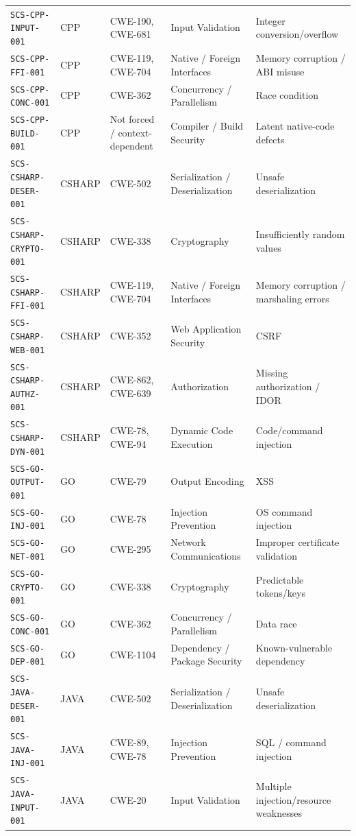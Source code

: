 \documentclass[10pt,letterpaper]{article}
\newcommand{\code}[1]{\begingroup\small\ttfamily\def\UrlFont{\ttfamily}\nolinkurl{#1}\endgroup}
\begin{document}
\begin{landscape}
\begin{longtable}{@{}P{1.3in}P{0.7in}P{1.4in}P{1.8in}P{3.8in}@{}}
\code{SCS-CPP-INPUT-001} & CPP & CWE-190, CWE-681 & Input Validation & Integer conversion/overflow\\
\code{SCS-CPP-FFI-001} & CPP & CWE-119, CWE-704 & Native / Foreign Interfaces & Memory corruption / ABI misuse\\
\code{SCS-CPP-CONC-001} & CPP & CWE-362 & Concurrency / Parallelism & Race condition\\
\code{SCS-CPP-BUILD-001} & CPP & Not forced / context-dependent & Compiler / Build Security & Latent native-code defects\\
\code{SCS-CSHARP-DESER-001} & CSHARP & CWE-502 & Serialization / Deserialization & Unsafe deserialization\\
\code{SCS-CSHARP-CRYPTO-001} & CSHARP & CWE-338 & Cryptography & Insufficiently random values\\
\code{SCS-CSHARP-FFI-001} & CSHARP & CWE-119, CWE-704 & Native / Foreign Interfaces & Memory corruption / marshaling errors\\
\code{SCS-CSHARP-WEB-001} & CSHARP & CWE-352 & Web Application Security & CSRF\\
\code{SCS-CSHARP-AUTHZ-001} & CSHARP & CWE-862, CWE-639 & Authorization & Missing authorization / IDOR\\
\code{SCS-CSHARP-DYN-001} & CSHARP & CWE-78, CWE-94 & Dynamic Code Execution & Code/command injection\\
\code{SCS-GO-OUTPUT-001} & GO & CWE-79 & Output Encoding & XSS\\
\code{SCS-GO-INJ-001} & GO & CWE-78 & Injection Prevention & OS command injection\\
\code{SCS-GO-NET-001} & GO & CWE-295 & Network Communications & Improper certificate validation\\
\code{SCS-GO-CRYPTO-001} & GO & CWE-338 & Cryptography & Predictable tokens/keys\\
\code{SCS-GO-CONC-001} & GO & CWE-362 & Concurrency / Parallelism & Data race\\
\code{SCS-GO-DEP-001} & GO & CWE-1104 & Dependency / Package Security & Known-vulnerable dependency\\
\code{SCS-JAVA-DESER-001} & JAVA & CWE-502 & Serialization / Deserialization & Unsafe deserialization\\
\code{SCS-JAVA-INJ-001} & JAVA & CWE-89, CWE-78 & Injection Prevention & SQL / command injection\\
\code{SCS-JAVA-INPUT-001} & JAVA & CWE-20 & Input Validation & Multiple injection/resource weaknesses\\

\end{longtable}
\end{landscape}
\end{document}

